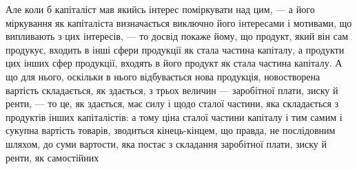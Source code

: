 Але коли б капіталіст мав якийсь інтерес поміркувати над цим, —
а його міркування як капіталіста визначається виключно його інтересами
і мотивами, що випливають з цих інтересів, — то досвід покаже йому, що
продукт, який він сам продукує, входить в інші сфери продукції як стала
частина капіталу, а продукти цих інших сфер продукції, входять в його продукт
як стала частина капіталу. А що для нього, оскільки в нього відбувається
нова продукція, новостворена вартість складається, як здається, з трьох
величин — заробітної плати, зиску й ренти, — то це, як здається, має силу
і щодо сталої частини, яка складається з продуктів інших капіталістів:
а тому ціна сталої частини капіталу і тим самим і сукупна вартість товарів,
зводиться кінець-кінцем, що правда, не послідовним шляхом, до суми вартости,
яка постає з складання заробітної плати, зиску й ренти, як самостійних
\parbreak{}  %
